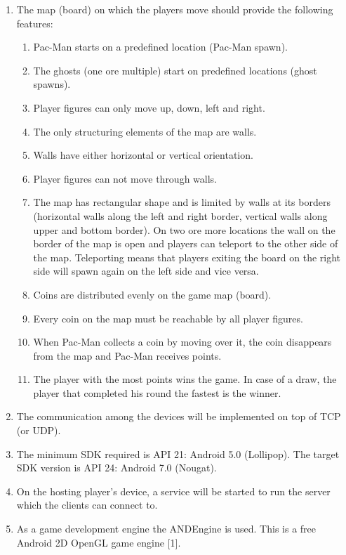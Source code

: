 \documentclass{report}
\begin{document}
\begin{enumerate}
	\item The map (board) on which the players move should provide the following features:
	\begin{enumerate}
		\item Pac-Man starts on a predefined location (Pac-Man spawn).
		\item The ghosts (one ore multiple) start on predefined locations (ghost spawns).
		\item Player figures can only move up, down, left and right.
		\item The only structuring elements of the map are walls.
		\item Walls have either horizontal or vertical orientation.
		\item Player figures can not move through walls.
		\item The map has rectangular shape and is limited by walls at its borders (horizontal walls along the left and right border, vertical walls along upper and bottom border). On two ore more locations the wall on the border of the map is open and players can teleport to the other side of the map. Teleporting means that players exiting the board on the right side will spawn again on the left side and vice versa.
		\item Coins are distributed evenly on the game map (board).
		\item Every coin on the map must be reachable by all player figures. 
		\item When Pac-Man collects a coin by moving over it, the coin disappears from the map and Pac-Man receives points.
		\item The player with the most points wins the game. In case of a draw, the player that completed his round the fastest is the winner.
	\end{enumerate}
	
	\item The communication among the devices will be implemented on top of TCP (or UDP).
	\item The minimum SDK required is API 21: Android 5.0 (Lollipop). The target SDK version is API 24: Android 7.0 (Nougat).
	\item On the hosting player's device, a service will be started to run the server which the clients can connect to.
	\item As a game development engine the ANDEngine is used. This is a free Android 2D OpenGL game engine [1].
	
\end{enumerate}
\end{document}
